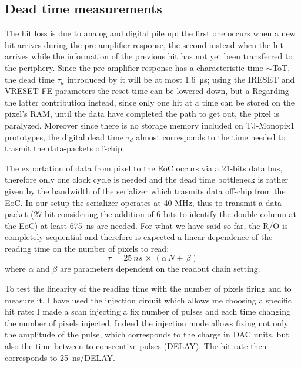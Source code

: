     \subsection{Dead time measurements}
        The hit loss is due to analog and digital pile up: the first one occurs when a new hit arrives during the pre-amplifier response, the second instead when the hit arrives while the information of the previous hit has not yet been transferred to the periphery.  
        Since the pre-amplifier response has a characteristic time $\sim$ToT, the dead time $\tau_{a}$ introduced by it will be at most \SI{1.6}{\us}; using the IRESET and VRESET FE parameters the reset time can be lowered down, but a    
        Regarding the latter contribution instead, since only one hit at a time can be stored on the pixel's RAM, until the data have completed the path to get out, the pixel is paralyzed. Moreover since there is no storage memory included on TJ-Monopix1 prototypes, the digital dead time $\tau_{d}$ almost corresponds to the time needed to trasmit the data-packets off-chip. 

        The exportation of data from pixel to the EoC occurs via a 21-bits data bus, therefore only one clock cycle is needed and the dead time bottleneck is rather given by the bandwidth of the serializer which trasmits data off-chip from the EoC. In our setup the serializer operates at 40 MHz, thus to transmit a data packet (27-bit considering the addition of 6 bits to identify the double-column at the EoC) at least \SI{675}{ns} are needed. 
        For what we have said so far, the R/O is completely sequential and therefore is expected a linear dependence of the reading time on the number of pixels to read:
        \begin{equation}
            \tau =\, 25\: \unit{ns}\, \times\, (\alpha\, N +\, \beta)
            \label{eq:reading_time}
        \end{equation}
        where $\alpha$ and $\beta$ are parameters dependent on the readout chain setting. 
        
        To test the linearity of the reading time with the number of pixels firing and to measure it, I have used the injection circuit which allows me choosing a specific hit rate: I made a scan injecting a fix number of pulses and each time changing the number of pixels injected.
        Indeed the injection mode allows fixing not only the amplitude of the pulse, which corresponds to the charge in DAC units, but also the time between to consecutive pulses (DELAY). The hit rate then corresponds to \SI{25}{ns}/DELAY.

